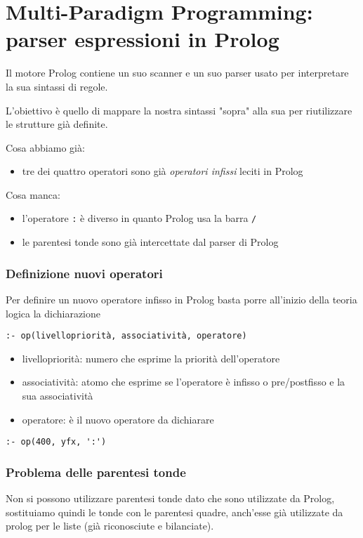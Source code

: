 \chapter{Multi-Paradigm Programming: parser espressioni in Prolog}

Il motore Prolog contiene un suo scanner e un suo parser usato per interpretare la sua sintassi di regole.

L'obiettivo è quello di mappare la nostra sintassi "sopra" alla sua per riutilizzare le strutture già definite.

Cosa abbiamo già:
\begin{itemize}
    \item tre dei quattro operatori sono già \textit{operatori infissi} leciti in Prolog
\end{itemize}

Cosa manca:
\begin{itemize}
    \item l'operatore \texttt{:} è diverso in quanto Prolog usa la barra \texttt{/}
    \item le parentesi tonde sono già intercettate dal parser di Prolog
\end{itemize}

\subsection{Definizione nuovi operatori}
Per definire un nuovo operatore infisso in Prolog basta porre all'inizio della teoria logica la dichiarazione
\begin{verbatim}
:- op(livellopriorità, associatività, operatore)
\end{verbatim}

\begin{itemize}
    \item livellopriorità: numero che esprime la priorità dell'operatore
    \item associatività: atomo che esprime se l'operatore è infisso o pre/postfisso e la sua associatività
    \item operatore: è il nuovo operatore da dichiarare
\end{itemize}
\begin{verbatim}
:- op(400, yfx, ':')
\end{verbatim}

\subsection{Problema delle parentesi tonde}
Non si possono utilizzare parentesi tonde dato che sono utilizzate da Prolog, sostituiamo quindi le tonde con le parentesi quadre, anch'esse già utilizzate da prolog per le liste (già riconosciute e bilanciate).

